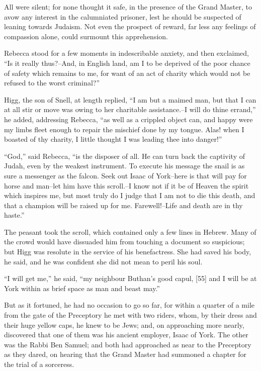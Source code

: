 All were silent; for none thought it safe, in the presence of the Grand
Master, to avow any interest in the calumniated prisoner, lest he should
be suspected of leaning towards Judaism. Not even the prospect of
reward, far less any feelings of compassion alone, could surmount this
apprehension.

Rebecca stood for a few moments in indescribable anxiety, and then
exclaimed, ``Is it really thus?--And, in English land, am I to be
deprived of the poor chance of safety which remains to me, for want of
an act of charity which would not be refused to the worst criminal?''

Higg, the son of Snell, at length replied, ``I am but a maimed man, but
that I can at all stir or move was owing to her charitable
assistance.--I will do thine errand,'' he added, addressing Rebecca,
``as well as a crippled object can, and happy were my limbs fleet enough
to repair the mischief done by my tongue. Alas! when I boasted of thy
charity, I little thought I was leading thee into danger!''

``God,'' said Rebecca, ``is the disposer of all. He can turn back the
captivity of Judah, even by the weakest instrument. To execute his
message the snail is as sure a messenger as the falcon. Seek out Isaac
of York--here is that will pay for horse and man--let him have this
scroll.--I know not if it be of Heaven the spirit which inspires me, but
most truly do I judge that I am not to die this death, and that a
champion will be raised up for me. Farewell!--Life and death are in thy
haste.''

The peasant took the scroll, which contained only a few lines in Hebrew.
Many of the crowd would have dissuaded him from touching a document so
suspicious; but Higg was resolute in the service of his benefactress.
She had saved his body, he said, and he was confident she did not mean
to peril his soul.

``I will get me,'' he said, ``my neighbour Buthan's good capul, {[}55{]}
and I will be at York within as brief space as man and beast may.''

But as it fortuned, he had no occasion to go so far, for within a
quarter of a mile from the gate of the Preceptory he met with two
riders, whom, by their dress and their huge yellow caps, he knew to be
Jews; and, on approaching more nearly, discovered that one of them was
his ancient employer, Isaac of York. The other was the Rabbi Ben Samuel;
and both had approached as near to the Preceptory as they dared, on
hearing that the Grand Master had summoned a chapter for the trial of a
sorceress.

